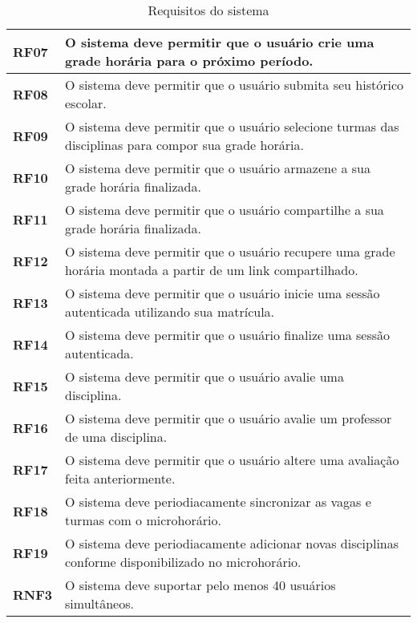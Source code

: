 \begin{table}[!ht]
    \begin{center}
        \begin{tabular}{ | m{} | p{} | }  
            \hline
            \textbf{RF07} & O sistema deve permitir que o usuário crie uma grade horária para o próximo período.\tabularnewline\hline
            \textbf{RF08} & O sistema deve permitir que o usuário submita seu histórico escolar.\tabularnewline\hline
            \textbf{RF09} & O sistema deve permitir que o usuário selecione turmas das disciplinas para compor sua grade horária.\tabularnewline\hline
            \textbf{RF10} & O sistema deve permitir que o usuário armazene a sua grade horária finalizada.\tabularnewline\hline
            \textbf{RF11} & O sistema deve permitir que o usuário compartilhe a sua grade horária finalizada. \tabularnewline\hline
            \textbf{RF12} & O sistema deve permitir que o usuário recupere uma grade horária montada a partir de um link compartilhado.\tabularnewline\hline
            
            \textbf{RF13} & O sistema deve permitir que o usuário inicie uma sessão autenticada utilizando sua matrícula.\tabularnewline\hline
            \textbf{RF14} & O sistema deve permitir que o usuário finalize uma sessão autenticada.\tabularnewline\hline
            \textbf{RF15} & O sistema deve permitir que o usuário avalie uma disciplina.\tabularnewline\hline
            \textbf{RF16} & O sistema deve permitir que o usuário avalie um professor de uma disciplina.\tabularnewline\hline
            \textbf{RF17} & O sistema deve permitir que o usuário altere uma avaliação feita anteriormente.\tabularnewline\hline

            \textbf{RF18} & O sistema deve periodiacamente sincronizar as vagas e turmas com o microhorário.\tabularnewline\hline
            \textbf{RF19} & O sistema deve periodiacamente adicionar novas disciplinas conforme disponibilizado no microhorário.\tabularnewline\hline

            \textbf{RNF3} & O sistema deve suportar pelo menos 40 usuários simultâneos.\tabularnewline\hline
        
        \end{tabular}
    \end{center}
    \caption{Requisitos do sistema}
    
    \label{tab:req-sistema}
\end{table}
